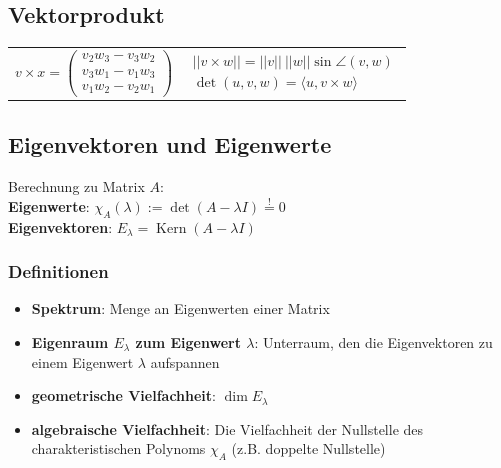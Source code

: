 \documentclass[german, fourcolumn, 8pt]{latex4ei/latex4ei_sheet}
\DeclareMathOperator{\Kern}{Kern}
\begin{document}
\begin{sectionbox}
    \subsection{Vektorprodukt}
    \tiny
    \begin{tabular}{c|c}
        $v\times x =
        \begin{pmatrix}
                v_2w_3-v_3w_2 \\
                v_3w_1-v_1w_3 \\
                v_1w_2-v_2w_1
            \end{pmatrix}$ &
        $\begin{matrix}
                 || v \times w || = ||v|| \: ||w|| \sin \angle (v,w) \\
                 \det (u, v, w) = \langle u, v \times w \rangle
             \end{matrix}$
    \end{tabular}
    \normalsize
\end{sectionbox}

\subsection{Eigenvektoren und Eigenwerte}
\begin{sectionbox}
    Berechnung zu Matrix $A$:\\
    \textbf{Eigenwerte}: $\chi_A(\lambda):=\det(A-\lambda I)\overset{!}{=}0$\\
    \textbf{Eigenvektoren}: $E_\lambda=\Kern(A-\lambda I)$
\end{sectionbox}

\begin{sectionbox}
    \subsubsection{Definitionen}
    \begin{itemize}
        \item \textbf{Spektrum}: Menge an Eigenwerten einer Matrix
        \item \textbf{Eigenraum $E_\lambda$ zum Eigenwert $\lambda$}: Unterraum, den die Eigenvektoren zu einem Eigenwert $\lambda$ aufspannen
        \item \textbf{geometrische Vielfachheit}: $\dim E_\lambda$
        \item \textbf{algebraische Vielfachheit}: Die Vielfachheit der Nullstelle des charakteristischen Polynoms $\chi_A$ (z.B. doppelte Nullstelle)
    \end{itemize}
\end{sectionbox}
\end{document}
